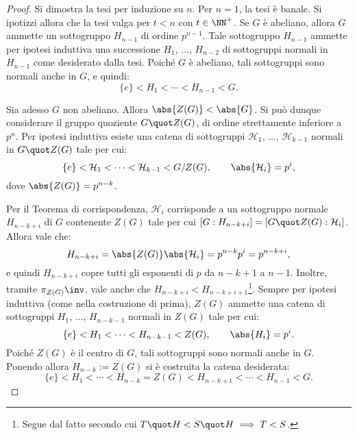 \documentclass[12pt]{scrartcl}
\begin{document}
	\begin{proof}
		Si dimostra la tesi per induzione su $n$. Per $n=1$, la tesi è banale. Si
		ipotizzi allora che la tesi valga per $t<n$ con $t \in \NN^+$. Se
		$G$ è abeliano, allora $G$ ammette un sottogruppo $H_{n-1}$ di ordine
		$p^{n-1}$. Tale sottogruppo $H_{n-1}$ ammette per ipotesi induttiva
		una successione $H_1$, ..., $H_{n-2}$ di sottogruppi normali in
		$H_{n-1}$ come desiderato dalla tesi.
		Poiché $G$ è abeliano, tali sottogruppi sono
		normali anche in $G$, e quindi:
		\[ \{ e \} < H_1 < \cdots < H_{n-1} < G. \] \smallskip
		
		
		Sia adesso $G$ non abeliano. Allora $\abs{Z(G)} < \abs{G}$. Si può
		dunque considerare il gruppo quoziente $G \quot Z(G)$, di ordine
		strettamente inferiore a $p^n$. Per ipotesi induttiva
		esiste una catena di sottogruppi $\mathcal{H}_1$, ...,
		$\mathcal{H}_{k-1}$ normali in $G \quot Z(G)$ tale per cui:
		\[ \{e\} < \mathcal{H}_1 < \cdots < \mathcal{H}_{k-1} < G/Z(G), \qquad \abs{\mathcal{H}_i} = p^i, \]
		dove $\abs{Z(G)} = p^{n-k}$. \medskip
		
		
		Per il Teorema di corrispondenza, $\mathcal{H}_i$ corrisponde
		a un sottogruppo normale $H_{n-k+i}$ di $G$ contenente $Z(G)$ tale per cui
		$[G : H_{n-k+i}] = [G \quot Z(G) : \mathcal{H}_i]$. Allora vale che:
		\[ H_{n-k+i} = \abs{Z(G)} \abs{\mathcal{H}_i} = p^{n-k} p^i = p^{n-k+i}, \]
		e quindi $H_{n-k+i}$ copre tutti gli esponenti di $p$ da $n-k+1$ a $n-1$.
		Inoltre, tramite $\pi_{Z(G)} \inv$, vale anche che $H_{n-k+i} < H_{n-k+i+1}$\footnote{Segue dal fatto
		secondo cui $T \quot H < S \quot H \implies T < S$.}. Sempre per ipotesi
		induttiva (come nella costruzione di prima), $Z(G)$ ammette una catena
		di sottogruppi $H_1$, ..., $H_{n-k-1}$ normali in $Z(G)$ tale per cui:
		\[
			\{e\} < H_1 < \cdots < H_{n-k-1} < Z(G), \qquad \abs{H_i} = p^i.
		\]
		Poiché $Z(G)$ è il centro di $G$, tali sottogruppi sono normali anche in $G$.
		Ponendo allora $H_{n-k} := Z(G)$ si è costruita la catena desiderata:
		\[ \{e\} < H_1 < \cdots < H_{n-k} = Z(G) < H_{n-k+1} < \cdots < H_{n-1} < G. \]
	\end{proof}
\end{document}
